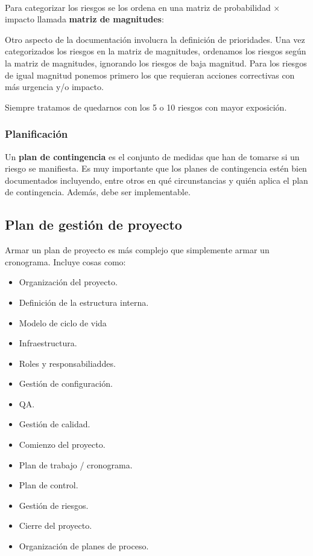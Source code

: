 \documentclass[]{article}
\begin{document}
~\newline

Para categorizar los riesgos se los ordena en una matriz de probabilidad $\times$ impacto llamada \textbf{matriz de magnitudes}:



Otro aspecto de la documentación involucra la definición de prioridades. Una vez categorizados los riesgos en la matriz de magnitudes, ordenamos los riesgos según la matriz de magnitudes, ignorando los riesgos de baja magnitud. Para los riesgos de igual magnitud ponemos primero los que requieran acciones correctivas con más urgencia y/o impacto.

Siempre tratamos de quedarnos con los 5 o 10 riesgos con mayor exposición.

\subsubsection{Planificación}
Un \textbf{plan de contingencia} es el conjunto de medidas que han de tomarse si un riesgo se manifiesta. Es muy importante que los planes de contingencia estén bien documentados incluyendo, entre otros en qué circunstancias y quién aplica el plan de contingencia. Además, debe ser implementable.


\subsection{Plan de gestión de proyecto}
Armar un plan de proyecto es más complejo que simplemente armar un cronograma. Incluye cosas como:
\begin{itemize}
	\item Organización del proyecto.
	\item Definición de la estructura interna.
	\item Modelo de ciclo de vida
	\item Infraestructura.
	\item Roles y responsabiliaddes.
	\item Gestión de configuración.
	\item QA.
	\item Gestión de calidad.
	\item Comienzo del proyecto.
	\item Plan de trabajo / cronograma.
	\item Plan de control.
	\item Gestión de riesgos.
	\item Cierre del proyecto.
	\item Organización de planes de proceso.
\end{itemize}
\end{document}
